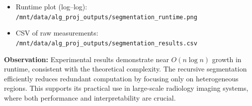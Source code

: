 \documentclass[conference]{IEEEtran}
\begin{document}
\begin{itemize}
    \item Runtime plot (log–log): \texttt{/mnt/data/alg_proj_outputs/segmentation_runtime.png}
    \item CSV of raw measurements: \texttt{/mnt/data/alg_proj_outputs/segmentation_results.csv}
\end{itemize}

\textbf{Observation:}  
Experimental results demonstrate near $O(n \log n)$ growth in runtime, consistent with the theoretical complexity. The recursive segmentation efficiently reduces redundant computation by focusing only on heterogeneous regions. This supports its practical use in large-scale radiology imaging systems, where both performance and interpretability are crucial.







\end{document}
